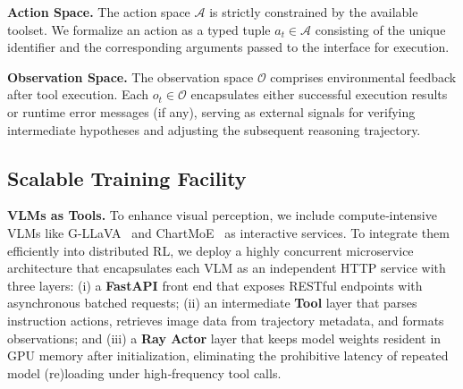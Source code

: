 \noindent \textbf{Action Space.}
The action space $\mathcal{A}$ is strictly constrained by the available toolset.
We formalize an action as a typed tuple $a_t \in \mathcal{A}$ consisting of the unique identifier and the corresponding arguments passed to the interface for execution.

\noindent \textbf{Observation Space.}
The observation space $\mathcal{O}$ comprises environmental feedback after tool execution.
Each $o_t\in\mathcal{O}$ encapsulates either successful execution results or runtime error messages (if any), serving as external signals for verifying intermediate hypotheses and adjusting the subsequent reasoning trajectory.


\subsection{Scalable Training Facility} \label{sec:4.3}
\noindent \textbf{VLMs as Tools.}
To enhance visual perception, we include compute‑intensive VLMs like {G-LLaVA}~\cite{gao2025gllava} and {ChartMoE}~\cite{xu2025chartmoe} as interactive services.
To integrate them efficiently into distributed RL, we deploy a highly concurrent microservice architecture that encapsulates each VLM as an independent HTTP service with three layers: 
(i) a \textbf{FastAPI} front end that exposes RESTful endpoints with asynchronous batched requests;
(ii) an intermediate \textbf{Tool} layer that parses instruction actions, retrieves image data from trajectory metadata, and formats observations; and
(iii) a \textbf{Ray Actor} layer that keeps model weights resident in GPU memory after initialization, eliminating the prohibitive latency of repeated model (re)loading under high‑frequency tool calls.



